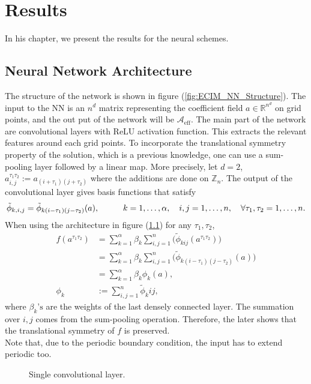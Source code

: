 \chapter{Results}
In his chapter, we present the results for the neural schemes.
\section{Neural Network Architecture}
The structure of the network is shown in figure (\ref{fig:ECIM_NN_Structure}). The input to the NN is an $n^d$ matrix representing the coefficient field $a\in \mathbb{R}^{n^d}$ on grid points, and the out put of the network will be $\mathscr{A}_\text{eff}$. The main part of the network are convolutional layers with ReLU activation function. This extracts the relevant features around each grid points. To incorporate the translational symmetry property of the solution, which is a  previous knowledge, one can use a sum-pooling layer followed by a linear map. More precisely, let $d=2$, $a_{i,j}^{\tau_{1}\tau_{2}}:=a_{(i+\tau_{1})(j+\tau_{2})}$ where the additions are done on $\mathbb{Z}_n$. The output of the convolutional layer gives basis functions that satisfy
\begin{equation*}
\tilde{\phi}_{k,i,j} = \tilde{\phi}_{k(i-\tau_{1})(j-\tau_{2})}(a), \hspace*{1cm} k=1,\dots, \alpha, \quad i,j = 1, \dots, n, \quad \forall \tau_{1}, \tau_{2} = 1, \dots,n.
\end{equation*}
When using the architecture in figure (\ref{fig:NLSE_NN_Structure}) for any $\tau_{1}, \tau_{2}$,
\begin{align*}
f(a^{\tau_{1}\tau_{2}}) &= \sum_{k=1}^{\alpha} \beta_k \sum_{i,j=1}^{n} \biggl( \tilde{\phi}_{kij}(a^{\tau_{1}\tau_{2}}) \biggr)\\ &= \sum_{k=1}^{\alpha} \beta_k \sum_{i,j=1}^{n} \biggl( \tilde{\phi}_{k(i-\tau_{1})(j-\tau_{2})}(a) \biggr)\\ &= \sum_{k=1}^{\alpha} \beta_k \phi_k (a), \\
\phi_k &:= \sum_{i,j=1}^{n} \tilde{\phi}_kij,
\end{align*}
where $\beta_k\text{'s}$ are the weights of the last densely connected layer. The summation over $i, j$ comes from the sum-pooling operation. Therefore, the later shows that the translational symmetry of $f$ is preserved.\\
Note that, due to the periodic boundary condition, the input has to extend periodic too. \\
\begin{figure}[h!]
	{
		\centering
		\def\svgwidth{\columnwidth}
		\scalebox{0.75}{}
		\caption{Single convolutional layer.}
		\label{fig:NLSE_NN_Structure}
	}
\end{figure}
